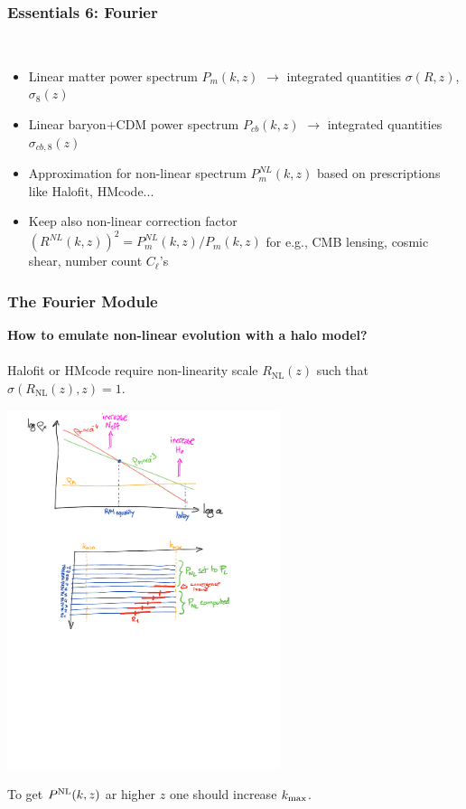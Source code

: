 

\begin{frame}[fragile]
\frametitle{Essentials 6: Fourier}


\mbox{}\\
\begin{itemize}
\item
Linear matter power spectrum $P_m(k,z)$ $\rightarrow$ integrated quantities $\sigma(R,z)$, $\sigma_8(z)$
\item
Linear baryon+CDM power spectrum $P_{cb}(k,z)$ $\rightarrow$ integrated quantities $\sigma_{cb,8}(z)$
\item
Approximation for non-linear spectrum $P^{NL}_m(k,z)$ based on prescriptions like {\Purple Halofit}, {\Purple HMcode}...
\item
Keep also non-linear correction factor $\left(R^{NL}(k,z)\right)^2 = P^{NL}_m(k,z) / P_m(k,z)$ for e.g., CMB lensing, cosmic shear, number count $C_{\ell}$'s
\end{itemize}

\end{frame}


\begin{frame}[fragile]
\frametitle{The Fourier Module}

{\bf How to emulate non-linear evolution with a halo model?}\\
\mbox{}\\
{\Purple Halofit} or {\Purple HMcode} require non-linearity scale $R_\mathrm{NL}(z)$ such that $\sigma(R_\mathrm{NL}(z), z)=1$.\\
\begin{center}
\includegraphics[width=8cm,angle=0]{Figures/Halofit_zmax.pdf}\\	
\end{center}
To get $P^{\rm NL}(k,z)$ ar higher $z$ one should increase $k_{\rm max}$.

\end{frame}

